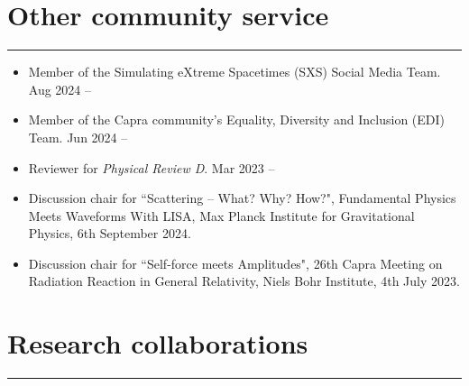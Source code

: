 \documentclass[10.5pt, oneside]{article}   	%
\begin{document}
 {\color{Sectioncolour}
\section*{Other community service}
\vspace{-3mm}
\noindent\rule{\linewidth}{0.6pt}}
\begin{itemize}
\item Member of the Simulating eXtreme Spacetimes (SXS) Social Media Team.  \hfill Aug 2024 --\\ \vspace{-5mm}
\item Member of the Capra community's Equality, Diversity and Inclusion (EDI) Team.  \hfill Jun 2024 --\\ \vspace{-5mm}
\item Reviewer for {\em Physical Review D}.  \hfill Mar 2023 --\\ \vspace{-5mm}
\item Discussion chair for ``Scattering -- What? Why? How?", Fundamental Physics Meets Waveforms With LISA, Max Planck Institute for Gravitational Physics, 6th September 2024.
\item Discussion chair for ``Self-force meets Amplitudes", 26th Capra Meeting on Radiation Reaction in General Relativity, Niels Bohr Institute, 4th July 2023.
\end{itemize} 

{\color{Sectioncolour}
\section*{Research collaborations}
\vspace{-3mm}
\noindent\rule{\linewidth}{0.6pt}}
\end{document}

